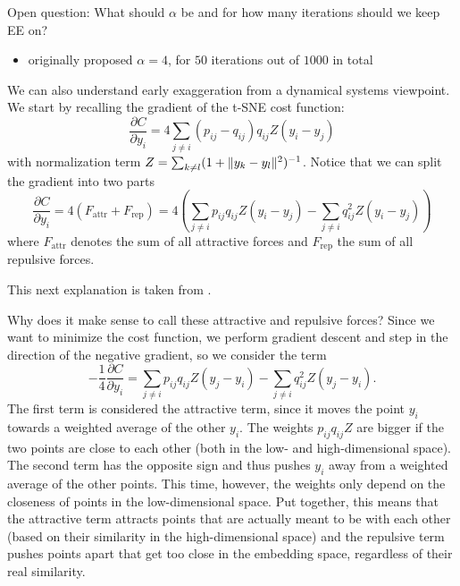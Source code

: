 Open question: What should $\alpha$ be and for how many iterations should we keep EE on? 
\begin{itemize}
    \item \cite{vdMaa08} originally proposed $\alpha = 4$, for $50$ iterations out of $1000$ in total 
\end{itemize}

We can also understand early exaggeration from a dynamical systems viewpoint. 
We start by recalling the gradient of the t-SNE cost function: 
\begin{equation}
    \frac{\partial C}{\partial y_i} = 4 \sum_{j \neq i} (p_{ij} - q_{ij}) q_{ij} Z (y_i - y_j)
\end{equation}
with normalization term $Z = \sum_{k \neq l} (1+ \lVert y_k - y_l\rVert^2 )^{-1}$. Notice that we can split the gradient into two parts 
\begin{equation}
    \frac{\partial C}{\partial y_i} = 4 (F_{\text{attr}} + F_{\text{rep}}) = 4 \left( \sum_{j \neq i } p_{ij} q_{ij} Z (y_i - y_j) - \sum_{j \neq i} q_{ij}^2 Z (y_i - y_j) \right) 
\end{equation}
where $F_{\text{attr}}$ denotes the sum of all attractive forces and $F_{\text{rep}}$ the sum of all repulsive forces. 

This next explanation is taken from \cite{LinStei22}.

Why does it make sense to call these attractive and repulsive forces? Since we want to minimize the cost function, we perform gradient descent and step in the direction of the negative gradient, so we consider the term
\begin{equation}
   - \frac{1}{4} \frac{\partial C}{\partial y_i} = \sum_{j \neq i } p_{ij} q_{ij} Z (y_j - y_i) - \sum_{j \neq i} q_{ij}^2 Z (y_j - y_i).  
\end{equation}
The first term is considered the attractive term, since it moves the point $y_i$ towards a weighted average of the other $y_i$. 
The weights $p_{ij} q_{ij} Z$ are bigger if the two points are close to each other (both in the low- and high-dimensional space). 
The second term has the opposite sign and thus pushes $y_i$ away from a weighted average of the other points. This time, however, the weights only depend on the closeness of points in the low-dimensional space. 
Put together, this means that the attractive term attracts points that are actually meant to be with each other (based on their similarity in the high-dimensional space) and the repulsive term pushes points apart that get too close in the embedding space, regardless of their real similarity. 


